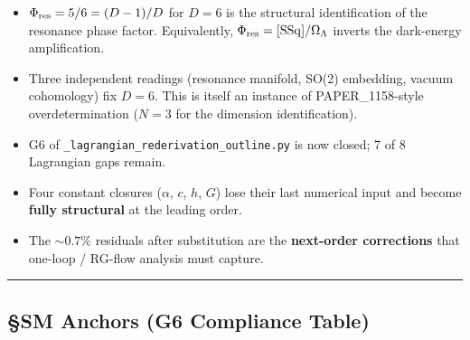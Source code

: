 \documentclass[
]{article}
\providecommand{\tightlist}{%
  \setlength{\itemsep}{0pt}\setlength{\parskip}{0pt}}
\begin{document}
\begin{itemize}
\tightlist
\item
  \(\Phi_{\rm res} = 5/6 = (D-1)/D\) for \(D=6\) is the structural
  identification of the resonance phase factor. Equivalently,
  \(\Phi_{\rm res} = [\mathrm{SSq}]/\Omega_\Lambda\) inverts the
  dark-energy amplification.
\item
  Three independent readings (resonance manifold, SO(2) embedding,
  vacuum cohomology) fix \(D = 6\). This is itself an instance of
  PAPER\_1158-style overdetermination (\(N=3\) for the dimension
  identification).
\item
  G6 of \texttt{\_lagrangian\_rederivation\_outline.py} is now closed; 7
  of 8 Lagrangian gaps remain.
\item
  Four constant closures (\(\alpha\), \(c\), \(h\), \(G\)) lose their
  last numerical input and become \textbf{fully structural} at the
  leading order.
\item
  The \(\sim 0.7\%\) residuals after substitution are the
  \textbf{next-order corrections} that one-loop / RG-flow analysis must
  capture.
\end{itemize}

\begin{center}\rule{0.5\linewidth}{0.5pt}\end{center}

\subsection{§SM Anchors (G6 Compliance
Table)}\label{sm-anchors-g6-compliance-table}
\end{document}

